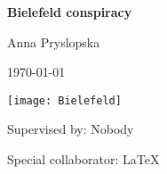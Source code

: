\begin{titlepage}
\begin{center}

{\Huge \textbf{Bielefeld conspiracy}}
\vspace*{2em}

{\Huge Anna Pryslopska}\\
\vspace*{2em}

{\Huge \today}
\vfill

\texttt{[image: Bielefeld]}
\vfill

Supervised by: Nobody

Special collaborator: \LaTeX

\end{center}
\end{titlepage}
